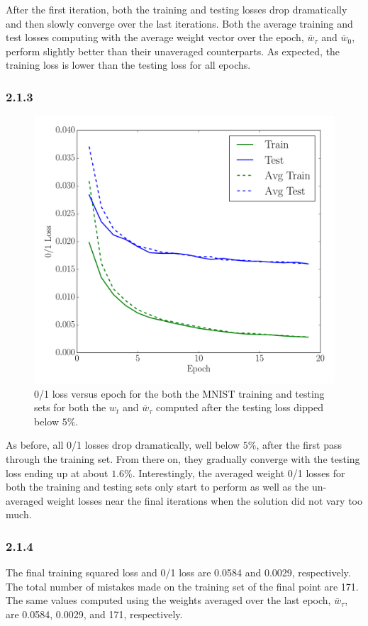 \documentclass[12pt]{amsart}
\begin{document}
After the first iteration, both the training and testing losses drop dramatically and then slowly converge over the last iterations.  Both the average training and test losses computing with the average weight vector over the epoch, $\bar{w}_{\tau}$ and $\bar{w}_0$, perform slightly better than their unaveraged counterparts.  As expected, the training loss is lower than the testing loss for all epochs.

\subsubsection*{2.1.3}
\begin{figure}[H]
	\includegraphics[width=\columnwidth]{pca_01_loss_masked.pdf}
    \caption{0/1 loss versus epoch for the both the MNIST training and testing sets for both the $w_t$ and $\bar{w}_{\tau}$ computed after the testing loss dipped below $5\%$.}
    \label{fig:pca_01_loss_masked}
\end{figure}
As before, all 0/1 losses drop dramatically, well below $5\%$, after the first pass through the training set.  From there on, they gradually converge with the testing loss ending up at about $1.6\%$.  Interestingly, the averaged weight 0/1 losses for both the training and testing sets only start to perform as well as the un-averaged weight losses near the final iterations when the solution did not vary too much.

\subsubsection*{2.1.4}
The final training squared loss and 0/1 loss are 0.0584 and 0.0029, respectively.  The total number of mistakes made on the training set of the final point are 171.  The same values computed using the weights averaged over the last epoch, $\bar{w}_{\tau}$, are 0.0584, 0.0029, and 171, respectively.
\end{document}
